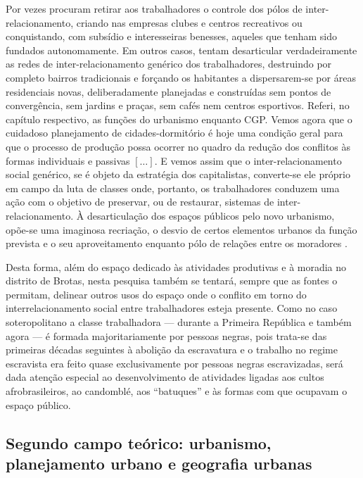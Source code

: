 \begin{citacao}
Por vezes procuram retirar aos trabalhadores o controle dos pólos de inter-relacionamento, criando nas empresas clubes e centros recreativos ou conquistando, com subsídio e interesseiras benesses, aqueles que tenham sido fundados autonomamente. Em outros casos, tentam desarticular verdadeiramente as redes de inter-relacionamento genérico dos trabalhadores, destruindo por completo bairros tradicionais e forçando os habitantes a dispersarem-se por áreas residenciais novas, deliberadamente planejadas e construídas sem pontos de convergência, sem jardins e praças, sem cafés nem centros esportivos. Referi, no capítulo respectivo, as funções do urbanismo enquanto CGP. Vemos agora que o cuidadoso planejamento de cidades-dormitório é hoje uma condição geral para que o processo de produção possa ocorrer no quadro da redução dos conflitos às formas individuais e passivas \([\dots]\). E vemos assim que o inter-relacionamento social genérico, se é objeto da estratégia dos capitalistas, converte-se ele próprio em campo da luta de classes onde, portanto, os trabalhadores conduzem uma ação com o objetivo de preservar, ou de restaurar, sistemas de inter-relacionamento. À desarticulação dos espaços públicos pelo novo urbanismo, opõe-se uma imaginosa recriação, o desvio de certos elementos urbanos da função prevista e o seu aproveitamento enquanto pólo de relações entre os moradores \cite[pp.~330-331]{BERNARDO1991}. 
\end{citacao}

Desta forma, além do espaço dedicado às atividades produtivas e à moradia no distrito de Brotas, nesta pesquisa também se tentará, sempre que as fontes o permitam, delinear outros usos do espaço onde o conflito em torno do interrelacionamento social entre trabalhadores esteja presente. Como no caso soteropolitano a classe trabalhadora --- durante a Primeira República e também agora --- é formada majoritariamente por pessoas negras, pois trata-se das primeiras décadas seguintes à abolição da escravatura e o trabalho no regime escravista era feito quase exclusivamente por pessoas negras escravizadas, será dada atenção especial ao desenvolvimento de atividades ligadas aos cultos afrobrasileiros, ao candomblé, aos ``batuques'' e às formas com que ocupavam o espaço público.

\subsection[Segundo campo teórico: urbanismo, planejamento urbano e geografia urbana]{Segundo campo teórico: urbanismo, planejamento urbano e geografia urbanas}
\label{subsec:sociogeogrurb}

